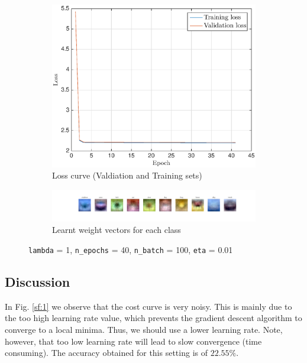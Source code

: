 \documentclass[journal, a4paper]{IEEEtran}
\begin{document}
\begin{figure}[h]
 \centering

\begin{subfigure}{0.5\textwidth}
  \centering
  \includegraphics[scale=0.47]{figs/Loss_4}
  \caption{Loss curve (Valdiation and Training sets)}
\label{sf:41}
\end{subfigure}

\begin{subfigure}{0.5\textwidth}
  \centering
  \includegraphics[scale=0.25]{figs/WeightMatrix_4}
  \caption{Learnt weight vectors for each class}
\label{sf:42}
\end{subfigure}

  \caption{\texttt{lambda} = 1, \texttt{n\_epochs} = 40, \texttt{n\_batch} = 100, \texttt{eta} = 0.01}
\label{sf:4}

\end{figure}

\subsection{Discussion}

In Fig. \ref{sf:1} we observe that the cost curve is very noisy. This is mainly due to the too high learning rate value, which prevents the gradient descent algorithm to converge to a local minima. Thus, we should use a lower learning rate. Note, however, that too low learning rate will lead to slow convergence (time consuming). The accuracy obtained for this setting is of $22.55 \%$.
\end{document}
